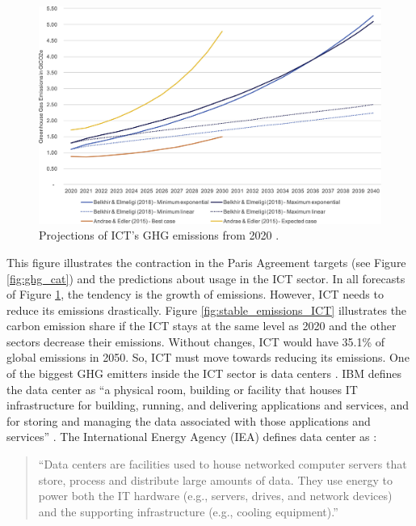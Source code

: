 \begin{figure}[!htb]
    \centering
    \includegraphics[scale=1]{Images/Related_works/gr4_lrg.jpg}
    \caption[Projections of ICT's GHG emissions from 2020.]{Projections of ICT's GHG emissions from 2020 \cite{freitag2021climate}.}
    \label{fig:projections_ICT}
\end{figure}

This figure illustrates the contraction in the Paris Agreement targets (see Figure \ref{fig:ghg_cat}) and the predictions about usage in the ICT sector. In all forecasts of Figure \ref{fig:projections_ICT}, the tendency is the growth of emissions. However, ICT needs to reduce its emissions drastically. Figure \ref{fig:stable_emissions_ICT} illustrates the carbon emission share if the ICT stays at the same level as 2020 and the other sectors decrease their emissions. Without changes, ICT would have 35.1\% of global emissions in 2050. So, ICT must move towards reducing its emissions. 
One of the biggest GHG emitters inside the ICT sector is data centers \cite{freitag2021climate}. IBM defines the data center as ``a physical room, building or facility that houses IT infrastructure for building, running, and delivering applications and services, and for storing and managing the data associated with those applications and services'' \cite{datacenterIBM}. The International Energy Agency (IEA) defines data center as \cite{centres2022data}:
\begin{quote}
    ``Data centers are facilities used to house networked computer servers that store, process and distribute large amounts of data. They use energy to power both the IT hardware (e.g., servers, drives, and network devices) and the supporting infrastructure (e.g., cooling equipment).''
\end{quote}

